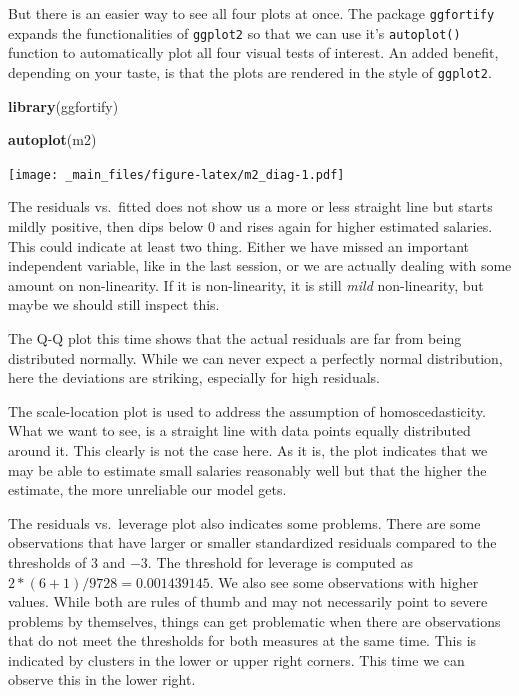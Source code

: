 \documentclass[
]{book}
\newenvironment{Shaded}{\begin{snugshade}}{\end{snugshade}}
\newcommand{\FunctionTok}[1]{\textcolor[rgb]{0.13,0.29,0.53}{\textbf{#1}}}
\newcommand{\NormalTok}[1]{#1}
\begin{document}
But there is an easier way to see all four plots at once. The package
\texttt{ggfortify} expands the functionalities of \texttt{ggplot2} so that we can use
it's \texttt{autoplot()} function to automatically plot all four visual tests
of interest. An added benefit, depending on your taste, is that the
plots are rendered in the style of \texttt{ggplot2}.

\begin{Shaded}
\begin{Highlighting}[]
\FunctionTok{library}\NormalTok{(ggfortify)}

\FunctionTok{autoplot}\NormalTok{(m2)}
\end{Highlighting}
\end{Shaded}

\texttt{[image: \_main\_files/figure-latex/m2\_diag-1.pdf]}

The residuals vs.~fitted does not show us a more or less straight line
but starts mildly positive, then dips below \(0\) and rises again for
higher estimated salaries. This could indicate at least two thing.
Either we have missed an important independent variable, like in the
last session, or we are actually dealing with some amount on
non-linearity. If it is non-linearity, it is still \emph{mild} non-linearity,
but maybe we should still inspect this.

The Q-Q plot this time shows that the actual residuals are far from
being distributed normally. While we can never expect a perfectly normal
distribution, here the deviations are striking, especially for high
residuals.

The scale-location plot is used to address the assumption of
homoscedasticity. What we want to see, is a straight line with data
points equally distributed around it. This clearly is not the case here.
As it is, the plot indicates that we may be able to estimate small
salaries reasonably well but that the higher the estimate, the more
unreliable our model gets.

The residuals vs.~leverage plot also indicates some problems. There are
some observations that have larger or smaller standardized residuals
compared to the thresholds of \(3\) and \(-3\). The threshold for leverage
is computed as \(2 * (6 + 1) / 9728 = 0.001439145\). We also see some
observations with higher values. While both are rules of thumb and may
not necessarily point to severe problems by themselves, things can get
problematic when there are observations that do not meet the thresholds
for both measures at the same time. This is indicated by clusters in the
lower or upper right corners. This time we can observe this in the lower
right.
\end{document}
